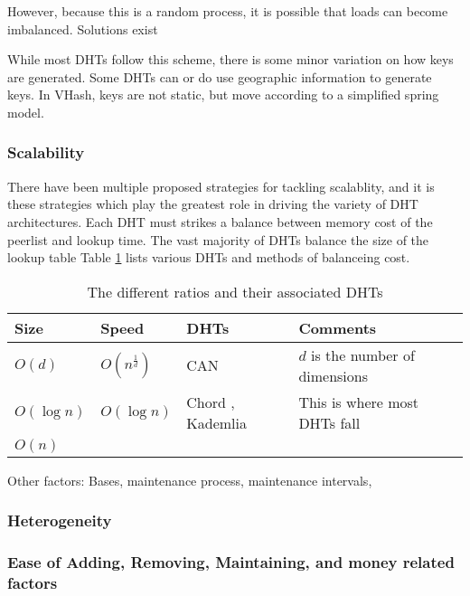 \documentclass[10pt,letterpaper]{report}
\begin{document}
However, because this is a random process, it is possible that loads can become imbalanced.
Solutions exist \cite{}%




While most DHTs follow this scheme, there is some minor variation on how keys are generated.
Some DHTs can or do use geographic information to generate keys.
In VHash, keys are not static, but move according to a simplified spring model.

\subsubsection{Scalability}
There have been multiple proposed strategies for tackling scalablity, and it is these strategies which play the greatest role in driving the variety of DHT architectures. 
Each DHT must strikes a balance between memory cost of the peerlist and lookup time. 
The vast majority of DHTs balance the size of the lookup table
Table \ref{tab:tradeoffs} lists various DHTs and methods of balanceing cost.


\begin{table}
    \centering
    \begin{tabular}{|l|l|l|l|}
    \hline
    Size & Speed & DHTs & Comments \\ \hline
    
    $O(d)$ & $O(n^{\frac{1}{d}})$ & CAN \cite{can} & $d$ is the number of dimensions \\ \hline
    
    $O(\log n)$ & $O(\log n)$ & Chord \cite{chord}, Kademlia \cite{kademlia} & This is where most DHTs fall \\ \hline
    
    $O(n)$ &  & & \\ \hline
    \end{tabular}
    \caption{The different ratios and their associated DHTs}
    \label{tab:tradeoffs}
\end{table}

Other factors: Bases, maintenance process, maintenance intervals,

\subsubsection{Heterogeneity}


\subsubsection{Ease of Adding, Removing, Maintaining, and money related factors}
\end{document}
